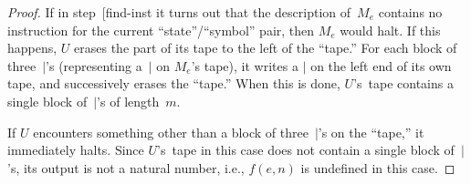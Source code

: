 \documentclass[10pt,a4paper]{article}
\makeatletter
\theoremstyle{plain}
\theoremstyle{definition}
\theoremstyle{remark}
\newcommand{\olref}{\@ifnextchar[{\olref@i}{\olref@final}}
\def\olref@i[#1]{\@ifnextchar[{\olref@ii}{\olref@final}}
\def\olref@ii[#1]{\@ifnextchar[{\olref@iii}{\olref@final}}
\def\olref@iii[#1]{\olref@final}
\def\olref@final#1{\ref{#1}}
\providecommand{\TMstroke}{\mid}
\makeatother
\begin{document}
\begin{proof}
  If in step~\olref{find-inst} it turns out that the description
  of~$M_e$ contains no instruction for the current
  ``state''/``symbol'' pair, then $M_e$ would halt. If this happens,
  $U$ erases the part of its tape to the left of the ``tape.'' For
  each block of three~$\TMstroke$'s (representing a~$\TMstroke$ on
  $M_e$'s tape), it writes a $\TMstroke$ on the left end of its own
  tape, and successively erases the ``tape.'' When this is done,
  $U$'s~tape contains a single block of~$\TMstroke$'s of length~$m$.
  
  If $U$ encounters something other than a block of
  three~$\TMstroke$'s on the ``tape,'' it immediately halts. Since
  $U$'s~tape in this case does not contain a single block
  of~$\TMstroke$'s, its output is not a natural number, i.e., $f(e,n)$
  is undefined in this case.
\end{proof}
\end{document}
